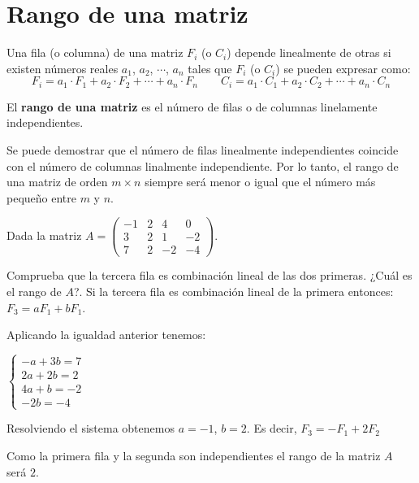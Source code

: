 \section{Rango de una matriz}

\begin{definicion}
Una fila (o columna) de una matriz $F_i$ (o $C_i$) depende linealmente de otras si existen números reales $a_1$, $a_2$, $\cdots$, $a_n$ tales que $F_i$ (o $C_i$) se pueden expresar como:
\[ F_i=a_1 \cdot F_1+a_2 \cdot F_2+\cdots + a_n \cdot F_n \qquad C_i=a_1\cdot C_1+a_2 \cdot C_2+\cdots + a_n \cdot C_n \]
\end{definicion}

\begin{definicion}
El \textbf{rango de una matriz} es el número de filas o de columnas linelamente independientes.
\end{definicion}

Se puede demostrar que el número de filas linealmente independientes coincide con el número de columnas linalmente independiente. Por lo tanto, el rango de una matriz de orden $m \times n$ siempre será menor o igual que el número más pequeño entre $m$ y $n$.

\begin{ejemplo}
Dada la matriz $A=\begin{pmatrix}
-1 & 2 & 4 & 0 \\
3 & 2 & 1 & -2 \\
7 & 2 & -2 & -4 
\end{pmatrix}$.

Comprueba que la tercera fila es combinación lineal de las dos primeras. ¿Cuál es el rango de $A$?.
\tcblower
Si la tercera fila es combinación lineal de la primera entonces: $F_3=aF_1+bF_1$.

Aplicando la igualdad anterior tenemos:

$\begin{cases} -a+3b=7 \\ 2a+2b=2 \\ 4a+b=-2 \\ -2b=-4 \end{cases}$

Resolviendo el sistema obtenemos $a=-1$, $b=2$. Es decir, $F_3=-F_1+2F_2$

Como la primera fila y la segunda son independientes el rango de la matriz $A$ será $2$.
\end{ejemplo}

